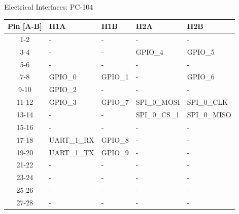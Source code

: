 
\begin{frame}{Electrical Interfaces: PC-104}

\begin{table}[!h]\tiny
    \centering
    \begin{tabular}{cllll}
        \toprule[1.5pt]
        \textbf{Pin [A-B]} & \textbf{H1A}     & \textbf{H1B}     & \textbf{H2A}  & \textbf{H2B}  \\
        \midrule
        1-2                & -                & -                & -             & -             \\
        3-4                & -                & -                & GPIO\_4       & GPIO\_5       \\
        5-6                & -                & -                & -             & -             \\
        7-8                & GPIO\_0          & GPIO\_1          & -             & GPIO\_6       \\
        9-10               & GPIO\_2          & -                & -             & -             \\
        11-12              & GPIO\_3          & GPIO\_7          & SPI\_0\_MOSI  & SPI\_0\_CLK   \\
        13-14              & -                & -                & SPI\_0\_CS\_1 & SPI\_0\_MISO  \\
        15-16              & -                & -                & -             & -             \\
        17-18              & UART\_1\_RX      & GPIO\_8          & -             & -             \\
        19-20              & UART\_1\_TX      & GPIO\_9          & -             & -             \\
        21-22              & -                & -                & -             & -             \\
        23-24              & -                & -                & -             & -             \\
        25-26              & -                & -                & -             & -             \\
        27-28              & -                & -                & -             & -             \\

\end{tabular}
\end{table}
\end{frame}
